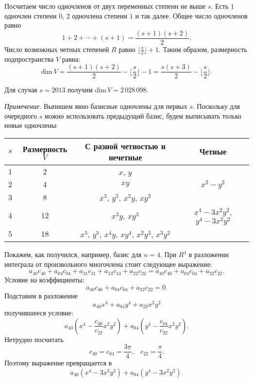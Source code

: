 \documentclass{article}
\begin{document}
Посчитаем число одночленов от двух переменных степени не выше $s$. Есть $1$ одночлен степени $0$, $2$ одночлена степени $1$ и так далее. Общее число 
одночленов равно 
$$1 + 2 + \cdots + (s+1) = \frac{(s+1)(s+2)}{2}.$$
Число возможных четных степеней $R$ равно $\lfloor \frac{s}{2} \rfloor + 1$. Таким образом, размерность подпространства $V$ равна:
$$\text{dim}\, V = \frac{(s+1)(s+2)}{2} - \lfloor \frac{s}{2} \rfloor - 1 = \frac{s(s+3)}{2} - \lfloor \frac{s}{2} \rfloor.$$

Для случая $s = 2013$ получим $\text{dim}\, V = 2\,028\,098$.

\textit{Примечение.} Выпишем явно базисные одночлены для первых $s$. Поскольку для очередного $s$ можно использовать предыдущий базис, будем выписывать 
только новые одночлены:
\begin{table}[h!]
\begin{tabular}{cccc}
$s$ & Размерность $V$ & С разной четностью и нечетные  & Четные\\
\hline
$1$ & $2$ & $x$, $y$ & \\
$2$ & $4$ & $xy$ & $x^2 - y^2$ \\
$3$ & $8$ & $x^3$, $y^3$, $x^2y$, $xy^2$ & \\
$4$ & $12$ & $x^3y$, $xy^3$ & $x^4 - 3x^2y^2$, $y^4 - 3x^2y^2$ \\
$5$ & $18$ & $x^5$, $y^5$, $x^4y$, $xy^4$, $x^2y^3$, $x^3y^2$ & \\
\end{tabular}
\end{table}

Покажем, как получился, например, базис для $n=4$. При $R^4$ в разложении интеграла от произвольного многочлена стоит следующее выражение:
$$a_{40} c_{40} + a_{04} c_{04} + a_{31} c_{31} + a_{13} c_{13} + a_{22} c_{22} = a_{40} c_{40} + a_{04} c_{04} + a_{22} c_{22}.$$
Условие на коэффициенты:
$$a_{40} c_{40} + a_{04} c_{04} + a_{22} c_{22} = 0.$$
Подставим в разложение
$$a_{40} x^4 + a_{04} y^4 + a_{22} x^2 y^2$$
получившееся условие:
$$a_{40} \left( x^4 -  \frac{c_{40}}{c_{22}} x^2y^2 \right) + a_{04} \left( y^4 - \frac{c_{04}}{c_{22}} x^2y^2 \right).$$
Нетрудно посчитать
$$c_{40} = c_{04} = \frac{3\pi}{4}, \;\;\; c_{22} = \frac{\pi}{4}.$$
Поэтому выражение превращается в
$$a_{40} (x^4 - 3x^2y^2) + a_{04} (y^4 - 3x^2y^2).$$
\end{document}
